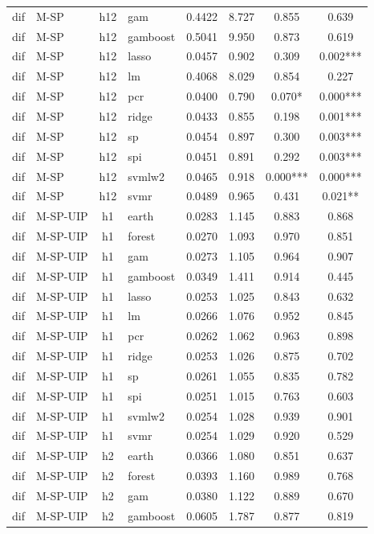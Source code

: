 \begin{ThreePartTable}
\begin{longtable}[t]{llclcccc}
dif & M-SP & h12 & gam & 0.4422 & 8.727 & 0.855 & 0.639\\
dif & M-SP & h12 & gamboost & 0.5041 & 9.950 & 0.873 & 0.619\\
dif & M-SP & h12 & lasso & 0.0457 & 0.902 & 0.309 & 0.002***\\
dif & M-SP & h12 & lm & 0.4068 & 8.029 & 0.854 & 0.227\\
dif & M-SP & h12 & pcr & 0.0400 & 0.790 & 0.070* & 0.000***\\
dif & M-SP & h12 & ridge & 0.0433 & 0.855 & 0.198 & 0.001***\\
dif & M-SP & h12 & sp & 0.0454 & 0.897 & 0.300 & 0.003***\\
dif & M-SP & h12 & spi & 0.0451 & 0.891 & 0.292 & 0.003***\\
dif & M-SP & h12 & svmlw2 & 0.0465 & 0.918 & 0.000*** & 0.000***\\
dif & M-SP & h12 & svmr & 0.0489 & 0.965 & 0.431 & 0.021**\\
\addlinespace
dif & M-SP-UIP & h1 & earth & 0.0283 & 1.145 & 0.883 & 0.868\\
dif & M-SP-UIP & h1 & forest & 0.0270 & 1.093 & 0.970 & 0.851\\
dif & M-SP-UIP & h1 & gam & 0.0273 & 1.105 & 0.964 & 0.907\\
dif & M-SP-UIP & h1 & gamboost & 0.0349 & 1.411 & 0.914 & 0.445\\
dif & M-SP-UIP & h1 & lasso & 0.0253 & 1.025 & 0.843 & 0.632\\
dif & M-SP-UIP & h1 & lm & 0.0266 & 1.076 & 0.952 & 0.845\\
dif & M-SP-UIP & h1 & pcr & 0.0262 & 1.062 & 0.963 & 0.898\\
dif & M-SP-UIP & h1 & ridge & 0.0253 & 1.026 & 0.875 & 0.702\\
dif & M-SP-UIP & h1 & sp & 0.0261 & 1.055 & 0.835 & 0.782\\
dif & M-SP-UIP & h1 & spi & 0.0251 & 1.015 & 0.763 & 0.603\\
dif & M-SP-UIP & h1 & svmlw2 & 0.0254 & 1.028 & 0.939 & 0.901\\
dif & M-SP-UIP & h1 & svmr & 0.0254 & 1.029 & 0.920 & 0.529\\
\addlinespace
dif & M-SP-UIP & h2 & earth & 0.0366 & 1.080 & 0.851 & 0.637\\
dif & M-SP-UIP & h2 & forest & 0.0393 & 1.160 & 0.989 & 0.768\\
dif & M-SP-UIP & h2 & gam & 0.0380 & 1.122 & 0.889 & 0.670\\
dif & M-SP-UIP & h2 & gamboost & 0.0605 & 1.787 & 0.877 & 0.819\\

\end{longtable}
\end{ThreePartTable}
